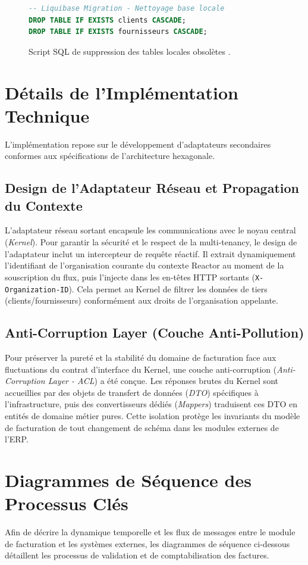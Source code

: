 \begin{figure}[htbp]
\centering
\begin{lstlisting}[language=SQL]
-- Liquibase Migration - Nettoyage base locale
DROP TABLE IF EXISTS clients CASCADE;
DROP TABLE IF EXISTS fournisseurs CASCADE;
\end{lstlisting}
\caption{Script SQL de suppression des tables locales obsolètes .}
\label{fig:liquibase_script}
\end{figure}

\section{Détails de l'Implémentation Technique}
L'implémentation repose sur le développement d'adaptateurs secondaires conformes aux spécifications de l'architecture hexagonale.

\subsection{Design de l'Adaptateur Réseau et Propagation du Contexte}
L'adaptateur réseau sortant encapsule les communications avec le noyau central (\textit{Kernel}). Pour garantir la sécurité et le respect de la multi-tenancy, le design de l'adaptateur inclut un intercepteur de requête réactif. Il extrait dynamiquement l'identifiant de l'organisation courante du contexte Reactor au moment de la souscription du flux, puis l'injecte dans les en-têtes HTTP sortants (\texttt{X-Organization-ID}). Cela permet au Kernel de filtrer les données de tiers (clients/fournisseurs) conformément aux droits de l'organisation appelante.

\subsection{Anti-Corruption Layer (Couche Anti-Pollution)}
Pour préserver la pureté et la stabilité du domaine de facturation face aux fluctuations du contrat d'interface du Kernel, une couche anti-corruption (\textit{Anti-Corruption Layer - ACL}) a été conçue. Les réponses brutes du Kernel sont accueillies par des objets de transfert de données (\textit{DTO}) spécifiques à l'infrastructure, puis des convertisseurs dédiés (\textit{Mappers}) traduisent ces DTO en entités de domaine métier pures. Cette isolation protège les invariants du modèle de facturation de tout changement de schéma dans les modules externes de l'ERP.

\section{Diagrammes de Séquence des Processus Clés}
Afin de décrire la dynamique temporelle et les flux de messages entre le module de facturation et les systèmes externes, les diagrammes de séquence ci-dessous détaillent les processus de validation et de comptabilisation des factures.

